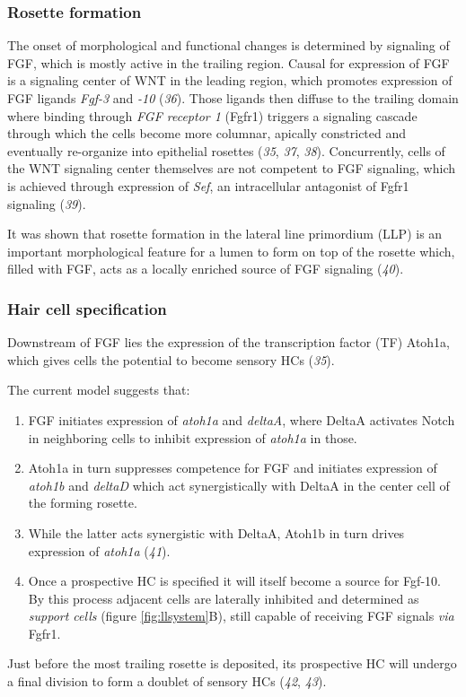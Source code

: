 \documentclass[10pt, b5paper, singlespacinge, twoside]{reedthesis} %
\providecommand{\tightlist}{%
  \setlength{\itemsep}{0pt}\setlength{\parskip}{0pt}}
\theoremstyle{definition}
\theoremstyle{definition}
\theoremstyle{definition}
\theoremstyle{remark}
\begin{document}
\hypertarget{rosette-formation}{%
\subsubsection{Rosette formation}\label{rosette-formation}}

The onset of morphological and functional changes is determined by signaling of FGF, which is mostly active in the trailing region. Causal for expression of FGF is a signaling center of WNT in the leading region, which promotes expression of FGF ligands \emph{Fgf-3} and \emph{-10} (\emph{36}). Those ligands then diffuse to the trailing domain where binding through \emph{FGF receptor 1} (Fgfr1) triggers a signaling cascade through which the cells become more columnar, apically constricted and eventually re-organize into epithelial rosettes (\emph{35}, \emph{37}, \emph{38}). Concurrently, cells of the WNT signaling center themselves are not competent to FGF signaling, which is achieved through expression of \emph{Sef}, an intracellular antagonist of Fgfr1 signaling (\emph{39}).

It was shown that rosette formation in the lateral line primordium (LLP) is an important morphological feature for a lumen to form on top of the rosette which, filled with FGF, acts as a locally enriched source of FGF signaling (\emph{40}).

\hypertarget{intro-atoh}{%
\subsubsection{Hair cell specification}\label{intro-atoh}}

Downstream of FGF lies the expression of the transcription factor (TF) Atoh1a, which gives cells the potential to become sensory HCs (\emph{35}).

The current model suggests that:
\begin{enumerate}
\def\labelenumi{\arabic{enumi}.}
\tightlist
\item
  FGF initiates expression of \emph{atoh1a} and \emph{deltaA}, where DeltaA activates Notch in neighboring cells to inhibit expression of \emph{atoh1a} in those.
\item
  Atoh1a in turn suppresses competence for FGF and initiates expression of \emph{atoh1b} and \emph{deltaD} which act synergistically with DeltaA in the center cell of the forming rosette.
\item
  While the latter acts synergistic with DeltaA, Atoh1b in turn drives expression of \emph{atoh1a} (\emph{41}).
\item
  Once a prospective HC is specified it will itself become a source for Fgf-10. By this process adjacent cells are laterally inhibited and determined as \emph{support cells} (figure \ref{fig:llsystem}B), still capable of receiving FGF signals \emph{via} Fgfr1.
\end{enumerate}
Just before the most trailing rosette is deposited, its prospective HC will undergo a final division to form a doublet of sensory HCs (\emph{42}, \emph{43}).
\end{document}
